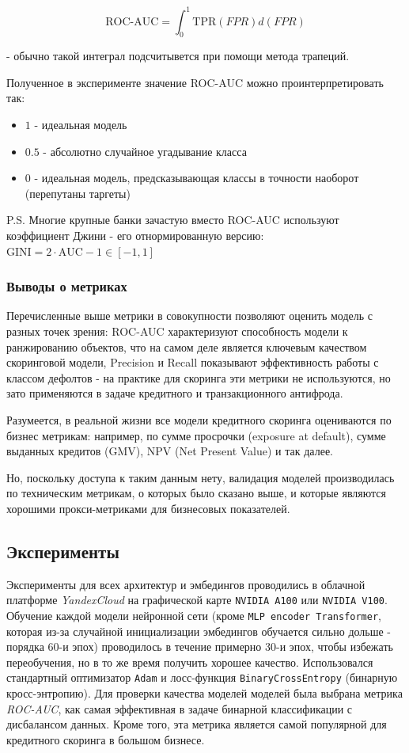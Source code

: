 \documentclass[12pt]{article}
\begin{document}
$$
\text{ROC-AUC} = \int_{0}^{1} \text{TPR}(FPR) d(FPR)
$$

\noindent - обычно такой интеграл подсчитывется при помощи метода трапеций.

\noindent Полученное в эксперименте значение ROC-AUC можно проинтерпретировать так:

\begin{itemize}
    \item $1$ - идеальная модель
    \item $0.5$ - абсолютно случайное угадывание класса
    \item $0$ - идеальная модель, предсказывающая классы в точности наоборот (перепутаны таргеты)
\end{itemize}

\noindent P.S. Многие крупные банки зачастую вместо ROC-AUC используют коэффициент Джини - его отнормированную версию: $\text{GINI} = 2 \cdot \text{AUC} - 1 \in [-1, 1]$

\subsubsection{Выводы о метриках}

Перечисленные выше метрики в совокупности позволяют оценить модель с разных точек зрения: ROC-AUC характеризуют способность модели к ранжированию объектов, что на самом деле является ключевым качеством скоринговой модели, Precision и Recall показывают эффективность работы с классом дефолтов - на практике для скоринга эти метрики не используются, но зато применяются в задаче кредитного и транзакционного антифрода.

Разумеется, в реальной жизни все модели кредитного скоринга оцениваются по бизнес метрикам: например, по сумме просрочки (exposure at default), сумме выданных кредитов (GMV), NPV (Net Present Value) и так далее. 

Но, поскольку доступа к таким данным нету, валидация моделей производилась по 
техническим метрикам, о которых было сказано выше, и которые являются хорошими прокси-метриками для бизнесовых показателей.

\newpage

\subsection{Эксперименты}

Эксперименты для всех архитектур и эмбедингов проводились в облачной платформе \textit{YandexCloud} на графической карте \texttt{NVIDIA A100} или \texttt{NVIDIA V100}. Обучение каждой модели нейронной сети (кроме \texttt{MLP encoder Transformer}, которая из-за случайной инициализации эмбедингов обучается сильно дольше - порядка 60-и эпох) проводилось в течение примерно 30-и эпох, чтобы избежать переобучения, но в то же время получить хорошее качество. Использовался стандартный оптимизатор \texttt{Adam} и лосс-функция \texttt{BinaryCrossEntropy} (бинарную кросс-энтропию). Для проверки качества моделей моделей была выбрана метрика \textit{ROC-AUC}, как самая эффективная в задаче бинарной классификации с дисбалансом данных. Кроме того, эта метрика является самой популярной для кредитного скоринга в большом бизнесе.
\end{document}
